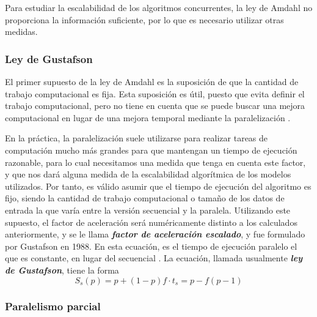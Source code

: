 \vspace{10pt}
Para estudiar la escalabilidad de los algoritmos concurrentes, la ley de Amdahl no proporciona la información 
suficiente, por lo que es necesario utilizar otras medidas.

\subsubsection*{Ley de Gustafson}

El primer supuesto de la ley de Amdahl es la suposición de que la cantidad de trabajo computacional es fija. Esta
suposición es útil, puesto que evita definir el trabajo computacional, pero no tiene en cuenta que se puede buscar una
mejora computacional en lugar de una mejora temporal mediante la paralelización \cite{Gustafson2011}. 

\vspace{10pt}
En la práctica, la paralelización suele utilizarse para realizar tareas de computación mucho más grandes para que 
mantengan un tiempo de ejecución razonable, para lo cual necesitamos una medida que tenga en cuenta este factor, y que 
nos dará alguna medida de la escalabilidad algorítmica de los modelos utilizados. Por tanto, es válido asumir que el 
tiempo de ejecución del algoritmo es fijo, siendo la cantidad de trabajo computacional o tamaño de los datos de entrada 
la que varía entre la versión secuencial y la paralela. Utilizando este supuesto, el factor de aceleración será 
numéricamente distinto a los calculados anteriormente, y se le llama \textbf{\textit{factor de aceleración escalado}}, 
y fue formulado por Gustafson en 1988. En esta ecuación, es el tiempo de ejecución paralelo el que es constante, en 
lugar del secuencial \cite{wilkinson_allen_2005}. La ecuación, llamada usualmente \textbf{\textit{ley de Gustafson}}, 
tiene la forma
\begin{equation}
    S_s(p)=p+(1-p)f\cdot t_s=p-f(p-1)
\end{equation}

\subsubsection*{Paralelismo parcial}

